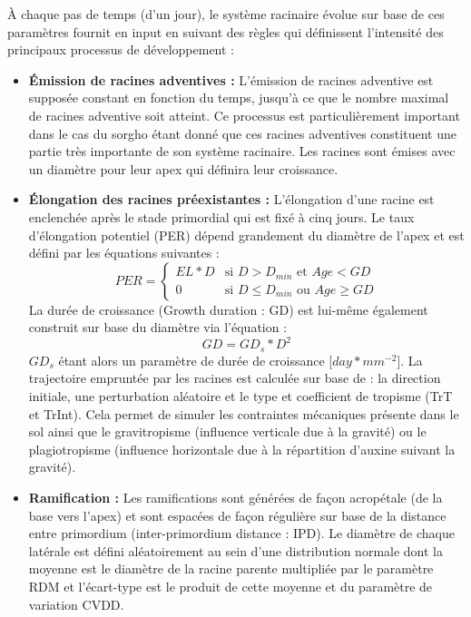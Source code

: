À chaque pas de temps (d'un jour), le système racinaire évolue sur base de ces paramètres fournit en input en suivant des règles qui définissent l'intensité des principaux processus de développement :

\begin{itemize}
    \item \textbf{Émission de racines adventives :} 
    L'émission de racines adventive est supposée constant en fonction du temps, jusqu'à ce que le nombre maximal de racines adventive soit atteint.
    Ce processus est particulièrement important dans le cas du sorgho étant donné que ces racines adventives constituent une partie très importante de son système racinaire.
    Les racines sont émises avec un diamètre pour leur apex qui définira leur croissance.
    \item \textbf{Élongation des racines préexistantes :}
    L'élongation d'une racine est enclenchée après le stade primordial qui est fixé à cinq jours.
    Le taux d'élongation potentiel (PER) dépend grandement du diamètre de l'apex et est défini par les équations suivantes :
    \begin{equation}
    PER = 
    \begin{cases}
    EL*D & \text{si } D>D_{min} \text{ et } Age < GD \\
    0 & \text{si } D \leq D_{min} \text{ ou } Age \geq GD
    \end{cases}
    \label{eq:PER}
    \end{equation}
    La durée de croissance (Growth duration : GD) est lui-même également construit sur base du diamètre via l'équation :
    \begin{equation} GD=GD_s*D^2 \end{equation}
    $GD_s$ étant alors un paramètre de durée de croissance [$day*mm^{-2}$].
    La trajectoire empruntée par les racines est calculée sur base de : la direction initiale, une perturbation aléatoire et le type et coefficient de tropisme (TrT et TrInt).
    Cela permet de simuler les contraintes mécaniques présente dans le sol ainsi que le gravitropisme (influence verticale due à la gravité) ou le plagiotropisme (influence horizontale due à la répartition d'auxine suivant la gravité).
    \item \textbf{Ramification :} 
    Les ramifications sont générées de façon acropétale (de la base vers l'apex) et sont espacées de façon régulière sur base de la distance entre primordium (inter-primordium distance : IPD).
    Le diamètre de chaque latérale est défini aléatoirement au sein d'une distribution normale dont la moyenne est le diamètre de la racine parente multipliée par le paramètre RDM et l'écart-type est le produit de cette moyenne et du paramètre de variation CVDD.

\end{itemize}

